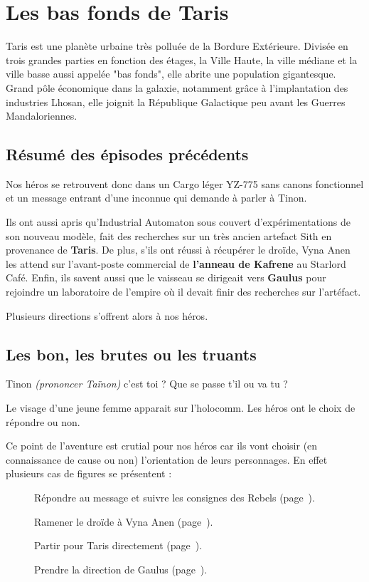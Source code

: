 \section{Les bas fonds de Taris}

Taris est une planète urbaine très polluée de la Bordure Extérieure. Divisée en trois grandes parties en fonction des étages, la Ville Haute, la ville médiane et la ville basse aussi appelée "bas fonds", elle abrite une population gigantesque. Grand pôle économique dans la galaxie, notamment grâce à l’implantation des industries Lhosan, elle joignit la République Galactique peu avant les Guerres Mandaloriennes. 

\subsection{Résumé des épisodes précédents}
Nos héros se retrouvent donc dans un Cargo léger YZ-775 sans canons fonctionnel et un message entrant d’une inconnue qui demande à parler à Tinon.

Ils ont aussi apris qu’Industrial Automaton sous couvert d’expérimentations de son nouveau modèle, fait des recherches sur un très ancien artefact Sith en provenance de \textbf{Taris}. De plus, s’ils ont réussi à récupérer le droïde, Vyna Anen les attend sur l’avant-poste commercial de \textbf{l’anneau de Kafrene} au Starlord Café. Enfin, ils savent aussi que le vaisseau se dirigeait vers \textbf{Gaulus} pour rejoindre un laboratoire de l’empire où il devait finir des recherches sur l’artéfact.

Plusieurs directions s’offrent alors à nos héros.

\subsection{Les bon, les brutes ou les truants}
\begin{quotebox}
    Tinon \emph{(prononcer Taïnon)} c’est toi ? Que se passe t’il ou va tu ?
\end{quotebox}
Le visage d’une jeune femme apparait sur l’holocomm. Les héros ont le choix de répondre ou non.

Ce point de l’aventure est crutial pour nos héros car ils vont choisir (en connaissance de cause ou non) l’orientation de leurs personnages. En effet plusieurs cas de figures se présentent :

\begin{description}
    \item[] Répondre au message et suivre les consignes des Rebels (page~\pageref{sec:les-rebels}).
    \item[] Ramener le droïde à Vyna Anen (page~\pageref{sec:retour-du-droide}).
    \item[] Partir pour Taris directement (page~\pageref{sec:refus-d-obtemperer}).
    \item[] Prendre la direction de Gaulus (page~\pageref{sec:l-empire}).
\end{description}

